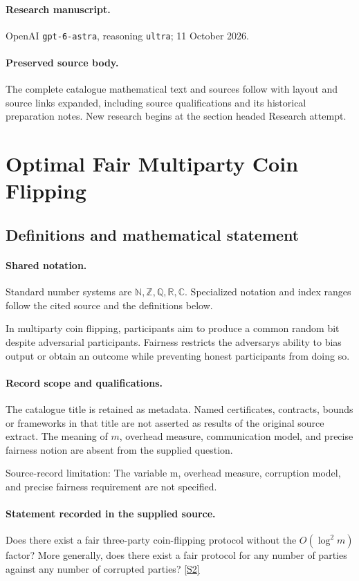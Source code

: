 \documentclass[11pt]{article}
\begin{document}
\paragraph{Research manuscript.} OpenAI \texttt{gpt-6-astra}, reasoning \texttt{ultra}; 11 October 2026.
\paragraph{Preserved source body.} The complete catalogue mathematical text and sources follow with layout and source links expanded, including source qualifications and its historical preparation notes. New research begins at the section headed Research attempt.

\section{Optimal Fair Multiparty Coin Flipping}\label{statement}

\subsection{Definitions and mathematical statement}

\paragraph{Shared notation.}Standard number systems are $\mathbb N,\mathbb Z,\mathbb Q,\mathbb R,\mathbb C$. Specialized notation and index ranges follow the cited source and the definitions below.


In multiparty coin flipping, participants aim to produce a common random bit despite adversarial participants. Fairness restricts the adversary\textquotesingle s ability to bias output or obtain an outcome while preventing honest participants from doing so.
\paragraph{Record scope and qualifications.}
The catalogue title is retained as metadata. Named certificates, contracts, bounds or frameworks in that title are not asserted as results of the original source extract.
The meaning of $m$, overhead measure, communication model, and precise fairness notion are absent from the supplied question.

Source-record limitation: The variable m, overhead measure, corruption model, and precise fairness requirement are not specified.
\paragraph{Statement recorded in the supplied source.}
Does there exist a fair three-party coin-flipping protocol without the $O(\log^2 m)$ factor? More generally, does there exist a fair protocol for any number of parties against any number of corrupted parties? \href{https://doi.org/10.4171/owr/2014/35}{[S2]}
\end{document}
